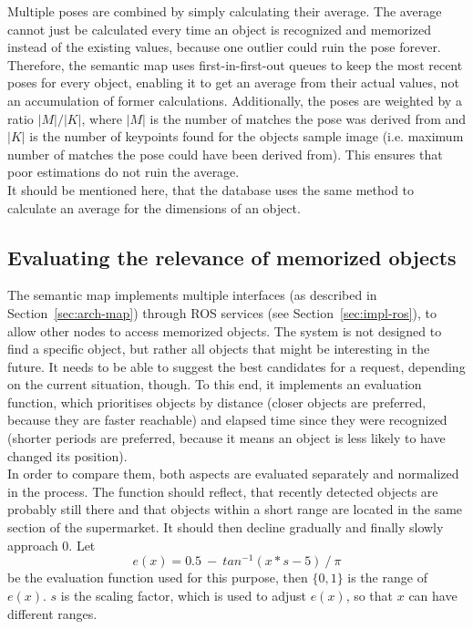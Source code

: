 Multiple poses are combined by simply calculating their average. The average cannot just be calculated every time an object is recognized and memorized instead of the existing values, because one outlier could ruin the pose forever. Therefore, the semantic map uses first-in-first-out queues to keep the most recent poses for every object, enabling it to get an average from their actual values, not an accumulation of former calculations. Additionally, the poses are weighted by a ratio $|M|/|K|$, where $|M|$ is the number of matches the pose was derived from and $|K|$ is the number of keypoints found for the objects sample image (i.e. maximum number of matches the pose could have been derived from). This ensures that poor estimations do not ruin the average. \\

It should be mentioned here, that the database uses the same method to calculate an average for the dimensions of an object.

\subsection{Evaluating the relevance of memorized objects}
\label{sec:impl-eval}
The semantic map implements multiple interfaces (as described in Section~\ref{sec:arch-map}) through ROS services (see Section~\ref{sec:impl-ros}), to allow other nodes to access memorized objects. The system is not designed to find a specific object, but rather all objects that might be interesting in the future. It needs to be able to suggest the best candidates for a request, depending on the current situation, though. To this end, it implements an evaluation function, which prioritises objects by distance (closer objects are preferred, because they are faster reachable) and elapsed time since they were recognized (shorter periods are preferred, because it means an object is less likely to have changed its position). \\

In order to compare them, both aspects are evaluated separately and normalized in the process. The function should reflect, that recently detected objects are probably still there and that objects within a short range are located in the same section of the supermarket. It should then decline gradually and finally slowly approach $0$. Let
\begin{equation*}
  e(x) = 0.5\ -\ tan^{-1}(x * s -5)\ /\ \pi
\end{equation*}
be the evaluation function used for this purpose, then $\{0, 1\}$ is the range of $e(x)$. $s$ is the scaling factor, which is used to adjust $e(x)$, so that $x$ can have different ranges.


